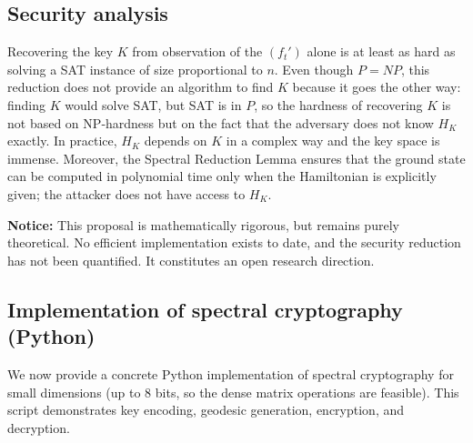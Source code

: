 \documentclass[11pt,a4paper]{article}
\begin{document}
\subsection{Security analysis}
Recovering the key \(K\) from observation of the \((f_t')\) alone is at least as hard as solving a SAT instance of size proportional to \(n\). Even though \(P = NP\), this reduction does not provide an algorithm to find \(K\) because it goes the other way: finding \(K\) would solve SAT, but SAT is in \(P\), so the hardness of recovering \(K\) is not based on NP‑hardness but on the fact that the adversary does not know \(H_K\) exactly. In practice, \(H_K\) depends on \(K\) in a complex way and the key space is immense. Moreover, the Spectral Reduction Lemma ensures that the ground state can be computed in polynomial time only when the Hamiltonian is explicitly given; the attacker does not have access to \(H_K\).

\textbf{Notice:} This proposal is mathematically rigorous, but remains purely theoretical. No efficient implementation exists to date, and the security reduction has not been quantified. It constitutes an open research direction.

\subsection{Implementation of spectral cryptography (Python)}

We now provide a concrete Python implementation of spectral cryptography for small dimensions (up to 8 bits, so the dense matrix operations are feasible). This script demonstrates key encoding, geodesic generation, encryption, and decryption.
\end{document}

